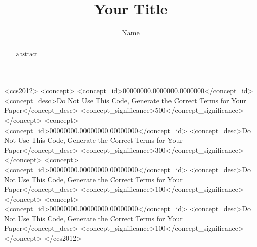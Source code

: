 \documentclass[sigconf,authordraft]{acmart}
\begin{document}
\title{Your Title}

\author{Name}



\begin{abstract}
  abstract
\end{abstract}

\begin{CCSXML}
<ccs2012>
 <concept>
  <concept_id>00000000.0000000.0000000</concept_id>
  <concept_desc>Do Not Use This Code, Generate the Correct Terms for Your Paper</concept_desc>
  <concept_significance>500</concept_significance>
 </concept>
 <concept>
  <concept_id>00000000.00000000.00000000</concept_id>
  <concept_desc>Do Not Use This Code, Generate the Correct Terms for Your Paper</concept_desc>
  <concept_significance>300</concept_significance>
 </concept>
 <concept>
  <concept_id>00000000.00000000.00000000</concept_id>
  <concept_desc>Do Not Use This Code, Generate the Correct Terms for Your Paper</concept_desc>
  <concept_significance>100</concept_significance>
 </concept>
 <concept>
  <concept_id>00000000.00000000.00000000</concept_id>
  <concept_desc>Do Not Use This Code, Generate the Correct Terms for Your Paper</concept_desc>
  <concept_significance>100</concept_significance>
 </concept>
</ccs2012>
\end{CCSXML}

\end{document}
